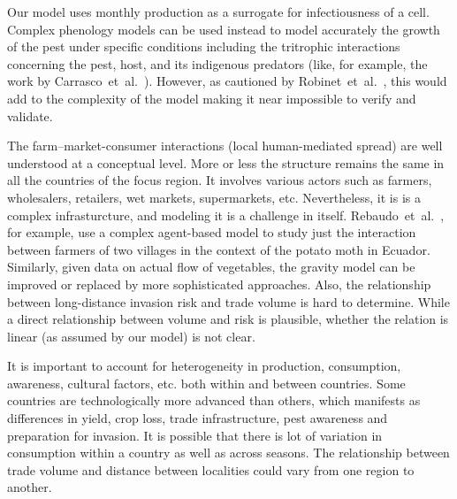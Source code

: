 \documentclass[11pt]{article}
\theoremstyle{definition}
\begin{document}
Our model uses monthly production as a surrogate for infectiousness of a
cell. Complex phenology models can be used instead to model accurately the
growth of the pest under specific conditions including the tritrophic
interactions concerning the pest, host, and its indigenous predators (like,
for example, the work by Carrasco~et~al.~\cite{carrasco2010unveiling}).
However, as cautioned by Robinet~et~al.~\cite{robinet2012suite}, this would
add to the complexity of the model making it near impossible to verify and
validate.

The farm--market-consumer interactions (local human-mediated spread) are
well understood at a conceptual level. More or less the structure remains
the same in all the countries of the focus region. It involves various
actors such as farmers, wholesalers, retailers, wet markets, supermarkets,
etc. Nevertheless, it is is a complex infrasturcture, and modeling it is a
challenge in itself. Rebaudo~et~al.~\cite{rebaudo2011}, for example, use a complex
agent-based model to study just the interaction between farmers of two
villages in the context of the potato moth in Ecuador. Similarly, given
data on actual flow of vegetables, the gravity model can be improved or
replaced by more sophisticated approaches. Also, the relationship between
long-distance invasion risk and trade volume is hard to determine. While
a direct relationship between volume and risk is plausible, whether
the relation is linear (as assumed by our model) is not clear.

It is important to account for heterogeneity in production, consumption,
awareness, cultural factors, etc. both within and between countries. Some
countries are technologically more advanced than others, which manifests as
differences in yield, crop loss, trade infrastructure, pest awareness and
preparation for invasion. It is possible that there is lot of variation in consumption
within a country as well as across seasons. The relationship between trade
volume and distance between localities could vary from one region to
another.
\end{document}
